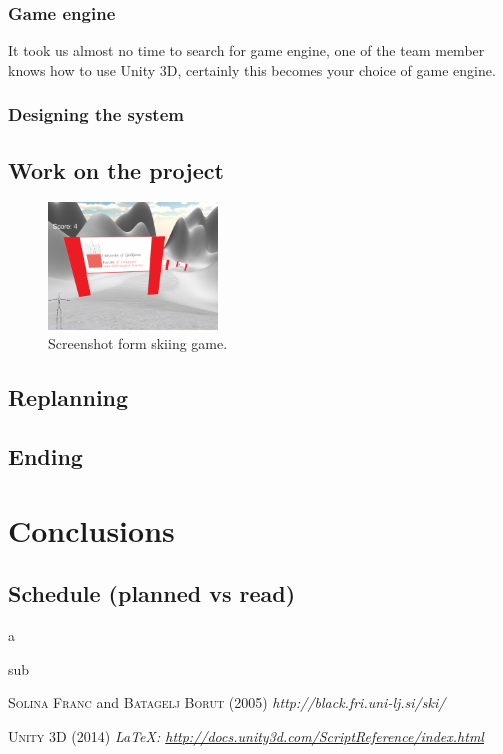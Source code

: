 \documentclass[fonts]{icst}
\begin{document}
\subsubsection{Game engine}
It took us almost no time to search for game engine, one of the team member knows how to use Unity 3D, certainly this becomes your choice of game engine. 

\subsubsection{Designing the system}

\subsection{Work on the project}

\begin{figure}
    \centering
    \includegraphics[width=0.4\textwidth]{game.png}
    \caption{Screenshot form skiing game.}
    \label{fig:awesome_image}
\end{figure}

\subsection{Replanning}

\subsection{Ending}

\section{Conclusions}

\subsection{Schedule (planned vs read)}
a

sub


\begin{thebibliography}{9}

 \textsc{Solina Franc} and \textsc{Batagelj Borut} (2005) \emph{http://black.fri.uni-lj.si/ski/}

 \textsc{Unity 3D} (2014) \emph{\LaTeX: \url{http://docs.unity3d.com/ScriptReference/index.html}}

\end{thebibliography}
\end{document}
